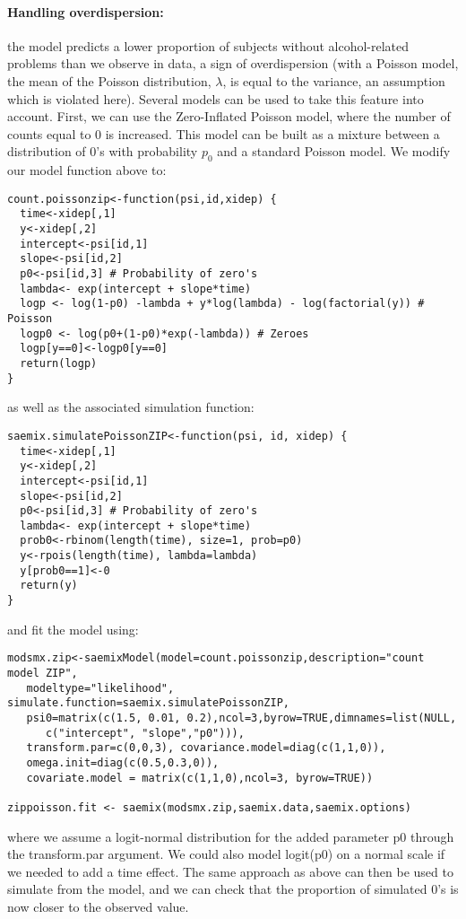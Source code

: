 \paragraph{Handling overdispersion:} the model predicts a lower proportion of subjects without alcohol-related problems than we observe in data, a sign of overdispersion (with a Poisson model, the mean of the Poisson distribution, $\lambda$, is equal to the variance, an assumption which is violated here). Several models can be used to take this feature into account. First, we can use the Zero-Inflated Poisson model, where the number of counts equal to 0 is increased. This model can be built as a mixture between a distribution of 0's with probability $p_0$ and a standard Poisson model. We modify our model function above to:
\begin{verbatim}
count.poissonzip<-function(psi,id,xidep) {
  time<-xidep[,1]
  y<-xidep[,2]
  intercept<-psi[id,1]
  slope<-psi[id,2]
  p0<-psi[id,3] # Probability of zero's
  lambda<- exp(intercept + slope*time)
  logp <- log(1-p0) -lambda + y*log(lambda) - log(factorial(y)) # Poisson
  logp0 <- log(p0+(1-p0)*exp(-lambda)) # Zeroes
  logp[y==0]<-logp0[y==0]
  return(logp)
}
\end{verbatim}
as well as the associated simulation function:
\begin{verbatim}
saemix.simulatePoissonZIP<-function(psi, id, xidep) {
  time<-xidep[,1]
  y<-xidep[,2]
  intercept<-psi[id,1]
  slope<-psi[id,2]
  p0<-psi[id,3] # Probability of zero's
  lambda<- exp(intercept + slope*time)
  prob0<-rbinom(length(time), size=1, prob=p0)
  y<-rpois(length(time), lambda=lambda)
  y[prob0==1]<-0
  return(y)
}
\end{verbatim}
and fit the model using:
\begin{verbatim}
modsmx.zip<-saemixModel(model=count.poissonzip,description="count model ZIP",
   modeltype="likelihood", simulate.function=saemix.simulatePoissonZIP,
   psi0=matrix(c(1.5, 0.01, 0.2),ncol=3,byrow=TRUE,dimnames=list(NULL, 
      c("intercept", "slope","p0"))), 
   transform.par=c(0,0,3), covariance.model=diag(c(1,1,0)), 
   omega.init=diag(c(0.5,0.3,0)),
   covariate.model = matrix(c(1,1,0),ncol=3, byrow=TRUE))

zippoisson.fit <- saemix(modsmx.zip,saemix.data,saemix.options)
\end{verbatim}
where we assume a logit-normal distribution for the added parameter p0 through the transform.par argument. We could also model logit(p0) on a normal scale if we needed to add a time effect. The same approach as above can then be used to simulate from the model, and we can check that the proportion of simulated 0's is now closer to the observed value.

